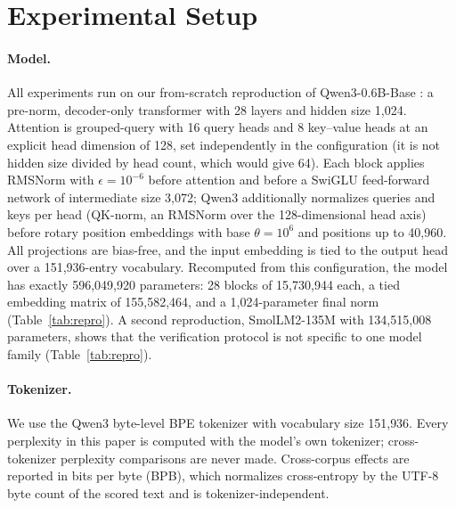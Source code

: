 \section{Experimental Setup}\label{sec:setup}

\paragraph{Model.}
All experiments run on our from-scratch reproduction of Qwen3-0.6B-Base
\citep{yang2025qwen3}: a pre-norm, decoder-only transformer
\citep{vaswani2017attention} with 28 layers and hidden size 1{,}024.
Attention is grouped-query \citep{ainslie2023gqa} with 16 query heads and
8 key--value heads at an explicit head dimension of 128, set independently
in the configuration (it is not hidden size divided by head count, which
would give 64). Each block applies RMSNorm \citep{zhang2019root} with
$\epsilon = 10^{-6}$ before attention and before a SwiGLU feed-forward
network \citep{shazeer2020glu} of intermediate size 3{,}072; Qwen3
additionally normalizes queries and keys per head (QK-norm, an RMSNorm
over the 128-dimensional head axis) before rotary position embeddings
\citep{su2021roformer} with base $\theta = 10^{6}$ and positions up to
40{,}960. All projections are bias-free, and the input embedding is tied
to the output head over a 151{,}936-entry vocabulary. Recomputed from
this configuration, the model has exactly 596{,}049{,}920 parameters:
28 blocks of 15{,}730{,}944 each, a tied embedding matrix of
155{,}582{,}464, and a 1{,}024-parameter final norm
(Table~\ref{tab:repro}). A second reproduction, SmolLM2-135M
\citep{allal2025smollm2} with 134{,}515{,}008 parameters, shows that the
verification protocol is not specific to one model family
(Table~\ref{tab:repro}).

\paragraph{Tokenizer.}
We use the Qwen3 byte-level BPE tokenizer with vocabulary size
151{,}936. Every perplexity in this paper is computed with the model's
own tokenizer; cross-tokenizer perplexity comparisons are never made.
Cross-corpus effects are reported in bits per byte (BPB), which
normalizes cross-entropy by the UTF-8 byte count of the scored text and
is tokenizer-independent.

